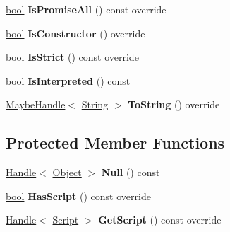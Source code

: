 \begin{DoxyCompactItemize}
\mbox{\hyperlink{classbool}{bool}} {\bfseries Is\+Promise\+All} () const override
\item 
\mbox{\label{classv8_1_1internal_1_1WasmStackFrame_a645f287384c008d60332173cb85a6b95}} 
\mbox{\hyperlink{classbool}{bool}} {\bfseries Is\+Constructor} () override
\item 
\mbox{\label{classv8_1_1internal_1_1WasmStackFrame_ac60faacf87b32e66b02a4b67099ca740}} 
\mbox{\hyperlink{classbool}{bool}} {\bfseries Is\+Strict} () const override
\item 
\mbox{\label{classv8_1_1internal_1_1WasmStackFrame_a4236a47c88ea74c2bb9b27481121f43e}} 
\mbox{\hyperlink{classbool}{bool}} {\bfseries Is\+Interpreted} () const
\item 
\mbox{\label{classv8_1_1internal_1_1WasmStackFrame_a2d593bed078264a3dd0ec6cd14d11a39}} 
\mbox{\hyperlink{classv8_1_1internal_1_1MaybeHandle}{Maybe\+Handle}}$<$ \mbox{\hyperlink{classv8_1_1internal_1_1String}{String}} $>$ {\bfseries To\+String} () override
\end{DoxyCompactItemize}
\subsection*{Protected Member Functions}
\begin{DoxyCompactItemize}
\item 
\mbox{\label{classv8_1_1internal_1_1WasmStackFrame_a219739d7f83a49cfa89cf857d45e8df9}} 
\mbox{\hyperlink{classv8_1_1internal_1_1Handle}{Handle}}$<$ \mbox{\hyperlink{classv8_1_1internal_1_1Object}{Object}} $>$ {\bfseries Null} () const
\item 
\mbox{\label{classv8_1_1internal_1_1WasmStackFrame_a552b94ca9f5f77dace44998e62c46f28}} 
\mbox{\hyperlink{classbool}{bool}} {\bfseries Has\+Script} () const override
\item 
\mbox{\label{classv8_1_1internal_1_1WasmStackFrame_a94a9886c19335d7f12d3c1b55ccbc793}} 
\mbox{\hyperlink{classv8_1_1internal_1_1Handle}{Handle}}$<$ \mbox{\hyperlink{classv8_1_1internal_1_1Script}{Script}} $>$ {\bfseries Get\+Script} () const override
\end{DoxyCompactItemize}
